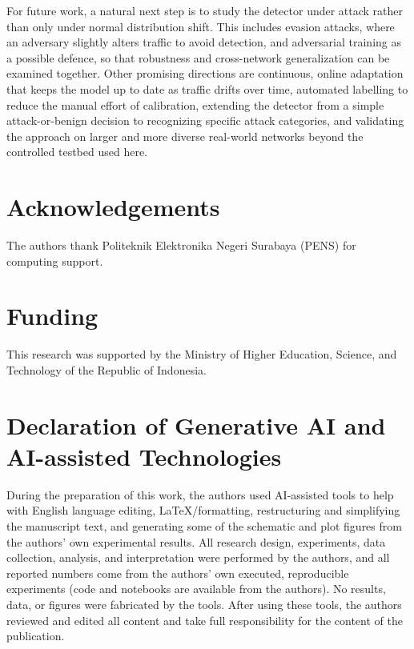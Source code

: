 \documentclass[11pt,a4paper]{article}
\begin{document}
For future work, a natural next step is to study the detector under attack rather than
only under normal distribution shift. This includes evasion attacks, where an adversary
slightly alters traffic to avoid detection, and adversarial training as a possible
defence, so that robustness and cross-network generalization can be examined together.
Other promising directions are continuous, online adaptation that keeps the model up to
date as traffic drifts over time, automated labelling to reduce the manual effort of
calibration, extending the detector from a simple attack-or-benign decision to recognizing
specific attack categories, and validating the approach on larger and more diverse
real-world networks beyond the controlled testbed used here.

\section*{Acknowledgements}
The authors thank Politeknik Elektronika Negeri Surabaya (PENS) for computing
support.

\section*{Funding}
This research was supported by the Ministry of Higher Education, Science, and Technology
of the Republic of Indonesia.

\section*{Declaration of Generative AI and AI-assisted Technologies}
During the preparation of this work, the authors used AI-assisted tools to help with
English language editing, LaTeX/formatting, restructuring and simplifying the manuscript
text, and generating some of the schematic and plot figures from the authors' own
experimental results. All research design, experiments, data collection, analysis, and
interpretation were performed by the authors, and all reported numbers come from the
authors' own executed, reproducible experiments (code and notebooks are available from
the authors). No results, data, or figures were fabricated by the tools. After using
these tools, the authors reviewed and edited all content and take full responsibility
for the content of the publication.
\end{document}
